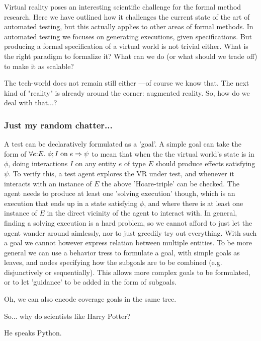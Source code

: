 \documentclass[sigplan]{acmart}\settopmatter{printfolios=false,printccs=false,printacmref=false}
\begin{document}
Virtual reality poses an interesting scientific challenge for the formal method research. 
Here we have outlined how it challenges the current state of the art of automated testing,
but this actually applies to other areas of formal methods. In automated testing we focuses
on generating executions, given specifications. But producing a formal specification of
a virtual world is not trivial either. What is the right paradigm to formalize it? 
What can we do (or what should we trade off) to make it as scalable?

The tech-world does not remain still either ---of course we know that. The next kind of "reality"
is already around the corner: augmented reality. So, how do we deal with that...?




\appendix  

\subsubsection*{Just my random chatter...}

A test can be declaratively formulated as a 'goal'. A simple goal can take
the form of $\forall e{:}E. \; \phi ; I \; {\rm on} \; e \Rightarrow \psi$
to mean that when the the virtual world's state is in $\phi$, doing
interactions $I$ on any entity $e$ of type $E$ should produce effects
satisfying $\psi$. To verify this, a test agent explores the VR under test,
and whenever it interacts with an instance of $E$ the above 'Hoare-triple'
can be checked. The agent needs to produce at least one
'solving execution' though, which is an execution that ends up in a state
satisfying $\phi$, and where there is at least one instance of $E$
in the direct vicinity of the agent to interact with. In general, finding
a solving execution is a hard problem, so we cannot afford to just let
the agent wander around aimlessly, nor to just greedily try out everything.
With such a goal we cannot however express relation between multiple
entities. To be more general
we can use a behavior tress \cite{xxx} to formulate a goal, with simple goals
as leaves, and nodes specifying how the subgoals are to be combined
(e.g. disjunctively or sequentially). This allows more complex goals to be
formulated, or to let 'guidance' to be added in the form of subgoals.

Oh, we can also encode coverage goals in the same tree.

So... why do scientists like Harry Potter? 

He speaks Python.








 
\end{document}
